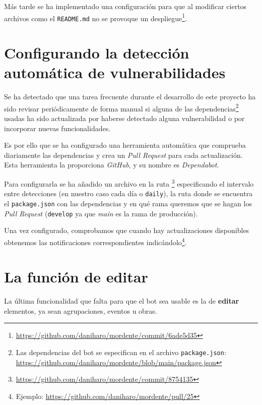 Más tarde se ha implementado una configuración para que al modificar ciertos archivos como el \texttt{README.md} no se provoque un despliegue\footnote{\url{https://github.com/daniharo/mordente/commit/6ade5d35}}.


\section{Configurando la detección automática de vulnerabilidades}


Se ha detectado que una tarea frecuente durante el desarrollo de este proyecto ha sido revisar periódicamente de forma manual si alguna de las dependencias\footnote{Las dependencias del bot se especifican en el archivo \texttt{package.json}: \url{https://github.com/daniharo/mordente/blob/main/package.json}} usadas ha sido actualizada por haberse detectado alguna vulnerabilidad o por incorporar nuevas funcionalidades.

Es por ello que se ha configurado una herramienta automática que comprueba diariamente las dependencias y crea un \textit{Pull Request} para cada actualización. Esta herramienta la proporciona \textit{GitHub}, y su nombre es \textit{Dependabot}.

Para configurarla se ha añadido un archivo en la ruta \footnote{\url{https://github.com/daniharo/mordente/commit/8754135}} especificando el intervalo entre detecciones (en nuestro caso cada día o \texttt{daily}), la ruta donde se encuentra el \texttt{package.json} con las dependencias y en qué rama queremos que se hagan los \textit{Pull Request} (\texttt{develop} ya que \textit{main} es la rama de producción).

Una vez configurado, comprobamos que cuando hay actualizaciones disponibles obtenemos las notificaciones correspondientes indicándolo\footnote{Ejemplo: \url{https://github.com/daniharo/mordente/pull/25}}.

\section{La función de editar}

La última funcionalidad que falta para que el bot sea usable es la de \textbf{editar} elementos, ya sean agrupaciones, eventos u obras.


